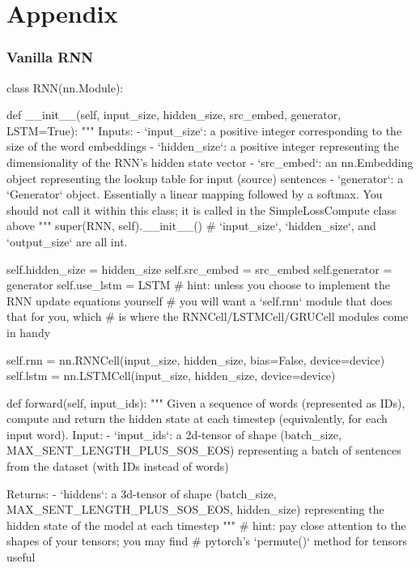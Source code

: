 \chapter*{Appendix}
\subsection*{Vanilla RNN}
\begin{python}
    class RNN(nn.Module):

    def __init__(self, input_size, hidden_size, src_embed, generator, LSTM=True):
      """
      Inputs:
        - `input_size`: a positive integer corresponding to the size of the
            word embeddings
        - `hidden_size`: a positive integer representing the dimensionality of
            the RNN's hidden state vector
        - `src_embed`: an nn.Embedding object representing the lookup table for
            input (source) sentences
        - `generator`: a `Generator` object. Essentially a linear mapping
            followed by a softmax. You should not call it within this class; it
            is called in the SimpleLossCompute class above
      """
      super(RNN, self).__init__()
      # `input_size`, `hidden_size`, and `output_size` are all int.

      self.hidden_size = hidden_size
      self.src_embed = src_embed
      self.generator = generator
      self.use_lstm = LSTM
      # hint: unless you choose to implement the RNN update equations yourself
      #       you will want a `self.rnn` module that does that for you, which
      #       is where the RNNCell/LSTMCell/GRUCell modules come in handy

      self.rnn = nn.RNNCell(input_size, hidden_size, bias=False, device=device)
      self.lstm = nn.LSTMCell(input_size, hidden_size, device=device)


    def forward(self, input_ids):
      """
      Given a sequence of words (represented as IDs), compute and return the
      hidden state at each timestep (equivalently, for each input word).
      Input:
        - `input_ids`: a 2d-tensor of shape
           (batch_size, MAX_SENT_LENGTH_PLUS_SOS_EOS) representing a batch of
           sentences from the dataset (with IDs instead of words)

      Returns:
        - `hiddens`: a 3d-tensor of shape
            (batch_size, MAX_SENT_LENGTH_PLUS_SOS_EOS, hidden_size) representing
            the hidden state of the model at each timestep
      """
      # hint: pay close attention to the shapes of your tensors; you may find
      #       pytorch's `permute()` method for tensors useful


\end{python}
